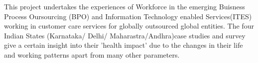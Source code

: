This project undertakes the experiences of Workforce in the emerging Buisness Process Oursourcing (BPO) and Information Technology enabled Services(ITES) working in customer care services for globally outsourced global entities. The four Indian States (Karnataka/ Delhi/ Maharastra/Andhra)case studies and survey give a certain insight into their 'health impact' due to the changes in their life and working patterns apart from many other parameters. 